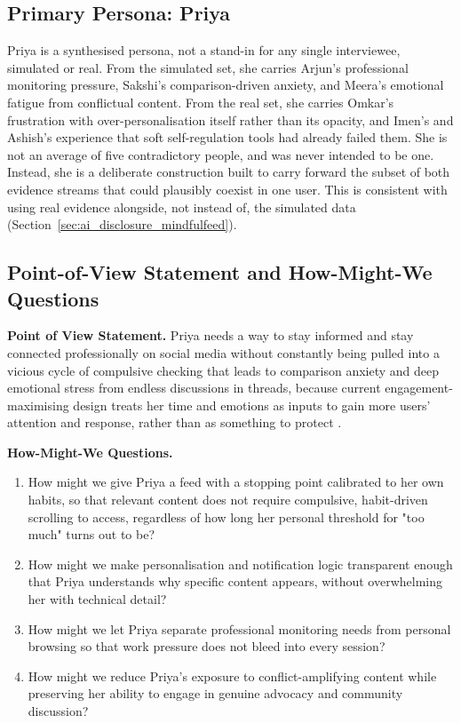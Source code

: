 \documentclass[11pt]{article}
\begin{document}
\subsection{Primary Persona: Priya}
\label{sec:persona_priya}
Priya is a synthesised persona, not a stand-in for any single interviewee, simulated or real. From the simulated set, she carries Arjun's professional monitoring pressure, Sakshi's comparison-driven anxiety, and Meera's emotional fatigue from conflictual content. From the real set, she carries Omkar's frustration with over-personalisation itself rather than its opacity, and Imen's and Ashish's experience that soft self-regulation tools had already failed them. She is not an average of five contradictory people, and was never intended to be one. Instead, she is a deliberate construction built to carry forward the subset of both evidence streams that could plausibly coexist in one user. This is consistent with using real evidence alongside, not instead of, the simulated data (Section~\ref{sec:ai_disclosure_mindfulfeed}).

\subsection{Point-of-View Statement and How-Might-We Questions}
\label{sec:mindfulfeed_pov_define}
\textbf{Point of View Statement.} Priya needs a way to stay informed and stay connected professionally on social media without constantly being pulled into a vicious cycle of compulsive checking that leads to comparison anxiety and deep emotional stress from endless discussions in threads, because current engagement-maximising design treats her time and emotions as inputs to gain more users' attention and response, rather than as something to protect \parencites[6]{9300898}[8]{2404919}.

\textbf{How-Might-We Questions.}
\begin{enumerate}
\item How might we give Priya a feed with a stopping point calibrated to her own habits, so that relevant content does not require compulsive, habit-driven scrolling to access, regardless of how long her personal threshold for "too much" turns out to be?
\item How might we make personalisation and notification logic transparent enough that Priya understands why specific content appears, without overwhelming her with technical detail?
\item How might we let Priya separate professional monitoring needs from personal browsing so that work pressure does not bleed into every session?
\item How might we reduce Priya's exposure to conflict-amplifying content while preserving her ability to engage in genuine advocacy and community discussion?
\end{enumerate}
\end{document}
